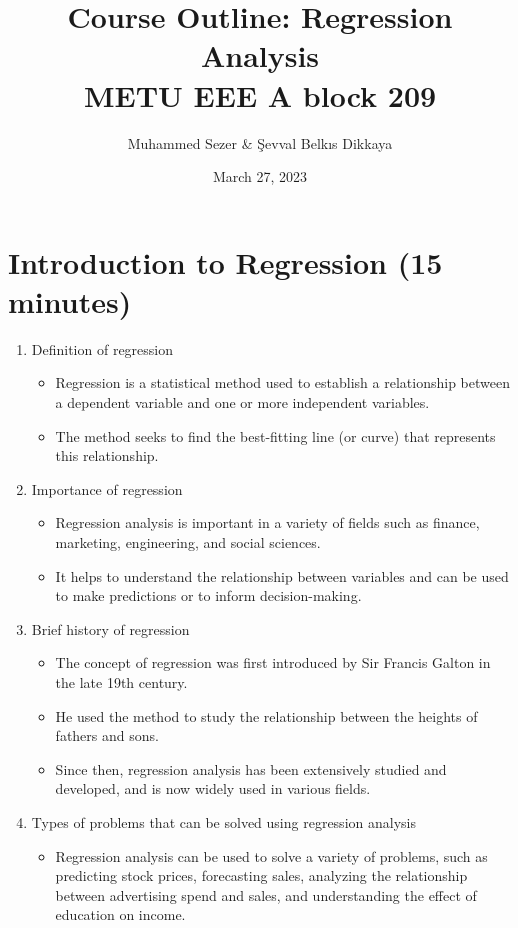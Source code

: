 \documentclass{article}
\begin{document}
\title{Course Outline: Regression Analysis\\ \small{METU EEE A block 209}}
\author{Muhammed Sezer \& Şevval Belkıs Dikkaya}
\date{March 27, 2023}

\maketitle

\section{Introduction to Regression (15 minutes)}
\begin{enumerate}[label=\alph*)]
\item Definition of regression
\begin{itemize}
\item Regression is a statistical method used to establish a relationship between a dependent variable and one or more independent variables.
\item The method seeks to find the best-fitting line (or curve) that represents this relationship.
\end{itemize}

\item Importance of regression
\begin{itemize}
\item Regression analysis is important in a variety of fields such as finance, marketing, engineering, and social sciences.
\item It helps to understand the relationship between variables and can be used to make predictions or to inform decision-making.
\end{itemize}

\item Brief history of regression
\begin{itemize}
\item The concept of regression was first introduced by Sir Francis Galton in the late 19th century.
\item He used the method to study the relationship between the heights of fathers and sons.
\item Since then, regression analysis has been extensively studied and developed, and is now widely used in various fields.
\end{itemize}

\item Types of problems that can be solved using regression analysis
\begin{itemize}
\item Regression analysis can be used to solve a variety of problems, such as predicting stock prices, forecasting sales, analyzing the relationship between advertising spend and sales, and understanding the effect of education on income.
\end{itemize}


\end{enumerate}
\end{document}
